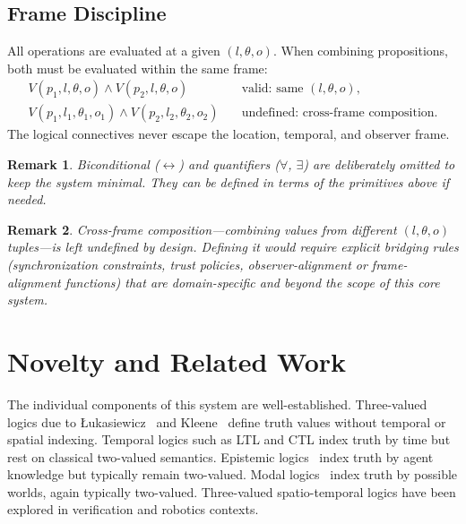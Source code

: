 \documentclass[11pt,a4paper]{article}
\newtheorem{remark}{Remark}
\begin{document}
\subsection{Frame Discipline}
All operations are evaluated at a given $(l, \theta, o)$. When combining
propositions, both must be evaluated within the same frame:
\begin{align*}
V(p_1, l, \theta, o) \land V(p_2, l, \theta, o) &\quad \text{valid: same } (l, \theta, o), \\
V(p_1, l_1, \theta_1, o_1) \land V(p_2, l_2, \theta_2, o_2) &\quad \text{undefined: cross-frame composition.}
\end{align*}
The logical connectives never escape the location, temporal, and observer
frame.

\begin{remark}
Biconditional ($\leftrightarrow$) and quantifiers ($\forall$, $\exists$) are
deliberately omitted to keep the system minimal. They can be defined in terms
of the primitives above if needed.
\end{remark}

\begin{remark}
Cross-frame composition---combining values from different
$(l, \theta, o)$ tuples---is left undefined by design. Defining it would
require explicit bridging rules (synchronization constraints, trust policies,
observer-alignment or frame-alignment functions) that are domain-specific and
beyond the scope of this core system.
\end{remark}

\section{Novelty and Related Work}
The individual components of this system are well-established. Three-valued
logics due to {\L}ukasiewicz~\cite{lukasiewicz1920} and
Kleene~\cite{kleene1952} define truth values without temporal or spatial
indexing. Temporal logics such as LTL and CTL index truth by time but rest on
classical two-valued semantics. Epistemic logics~\cite{hintikka1962} index
truth by agent knowledge but typically remain two-valued. Modal
logics~\cite{kripke1963} index truth by possible worlds, again typically
two-valued. Three-valued spatio-temporal logics have been explored in
verification and robotics contexts.
\end{document}
